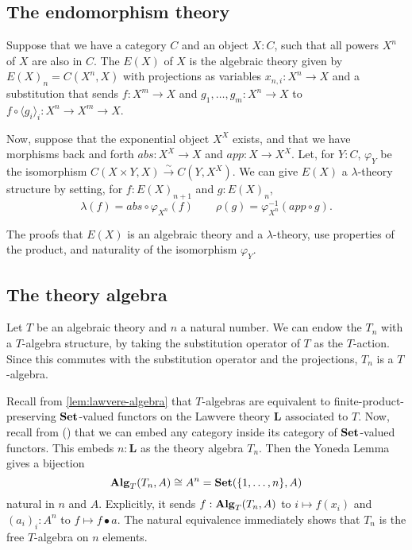 \subsection{The endomorphism theory}

\begin{definition}\label{def:endomorphism-theory}
  Suppose that we have a category $ C $ and an object $ X: C $, such that all powers $ X^n $ of $ X $ are also in $ C $.
  The  $ E(X) $ of $ X $ is the algebraic theory given by $ E(X)_n = C(X^n, X) $ with projections as variables $ x_{n, i}: X^n \to X $ and a substitution that sends $ f: X^m \to X $ and $ g_1, \dots, g_m: X^n \to X $ to $ f \circ \langle g_i \rangle_i: X^n \to X^m \to X $.
\end{definition}

\begin{definition}
  Now, suppose that the exponential object $ X^X $ exists, and that we have morphisms back and forth $ abs: X^X \to X $ and $ app: X \to X^X $. Let, for $ Y: C $, $ \varphi_Y $ be the isomorphism $ C(X \times Y, X) \xrightarrow{\sim} C(Y, X^X) $.
  We can give $ E(X) $ a $ \lambda $-theory structure by setting, for $ f: E(X)_{n + 1} $ and $ g: E(X)_n $,
  \[ \lambda(f) = abs \circ \varphi_{X^n}(f) \qquad \rho(g) = \varphi_{X^n}^{-1}(app \circ g). \]
\end{definition}

The proofs that $ E(X) $ is an algebraic theory and a $ \lambda $-theory, use properties of the product, and naturality of the isomorphism $ \varphi_Y $.

\subsection{The theory algebra}
\begin{example}
  Let $ T $ be an algebraic theory and $ n $ a natural number. We can endow the $ T_n $ with a $ T $-algebra structure, by taking the substitution operator of $ T $ as the $ T $-action. Since this commutes with the substitution operator and the projections, $ T_n $ is a $ T $-algebra.
\end{example}

\begin{remark}
  Recall from \ref{lem:lawvere-algebra} that $ T $-algebras are equivalent to finite-product-preserving $ \mathbf{Set} $-valued functors on the Lawvere theory $ \mathbf L $ associated to $ T $. Now, recall from (\TODO) that we can embed any category inside its category of $ \mathbf{Set} $-valued functors. This embeds $ n: \mathbf L $ as the theory algebra $ T_n $. Then the Yoneda Lemma gives a bijection
  \[ \mathbf{Alg}_{T}(T_n, A) \cong A^n = \mathbf{Set}(\{ 1, \dots, n \}, A) \]
  natural in $ n $ and $ A $. Explicitly, it sends $ f: \mathbf{Alg}_{T}(T_n, A) $ to $ i \mapsto f(x_i) $ and $ (a_i)_i : A^n $ to $ f \mapsto f \bullet a $. The natural equivalence immediately shows that $ T_n $ is the free $ T $-algebra on $ n $ elements.
\end{remark}

